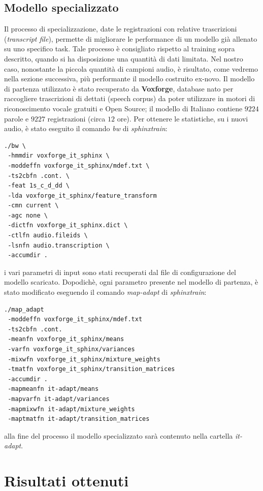 \documentclass[12pt]{article}
\begin{document}
    \subsection{Modello specializzato}
    Il processo di specializzazione, date le registrazioni con relative trascrizioni (\textit{transcript file}), permette di migliorare le performance di un modello già allenato su uno specifico task. Tale processo è consigliato rispetto al training sopra descritto, quando si ha disposizione una quantità di dati limitata. Nel nostro caso, nonostante la piccola quantità di campioni audio, è risultato, come vedremo nella sezione successiva, più performante il modello costruito ex-novo.
    Il modello di partenza utilizzato è stato recuperato da \textbf{Voxforge}, database nato per raccogliere trascrizioni di dettati (speech corpus) da poter utilizzare in motori di riconoscimento vocale gratuiti e Open Source; il modello di Italiano contiene $9224$ parole e $9227$ registrazioni (circa $12$ ore).
    Per ottenere le statistiche, su i nuovi audio, è stato eseguito il comando \textit{bw} di \textit{sphinxtrain}:
    
    \begin{lstlisting}
./bw \
 -hmmdir voxforge_it_sphinx \
 -moddeffn voxforge_it_sphinx/mdef.txt \
 -ts2cbfn .cont. \
 -feat 1s_c_d_dd \
 -lda voxforge_it_sphinx/feature_transform
 -cmn current \
 -agc none \
 -dictfn voxforge_it_sphinx.dict \
 -ctlfn audio.fileids \
 -lsnfn audio.transcription \
 -accumdir .    
    \end{lstlisting} 
    i vari parametri di input sono stati recuperati dal file di configurazione del modello scaricato.
    Dopodichè, ogni parametro presente nel modello di partenza, è stato modificato eseguendo il comando \textit{map-adapt} di \textit{sphinxtrain}:
    \begin{lstlisting}
./map_adapt 
 -moddeffn voxforge_it_sphinx/mdef.txt 
 -ts2cbfn .cont. 
 -meanfn voxforge_it_sphinx/means 
 -varfn voxforge_it_sphinx/variances 
 -mixwfn voxforge_it_sphinx/mixture_weights 
 -tmatfn voxforge_it_sphinx/transition_matrices 
 -accumdir . 
 -mapmeanfn it-adapt/means 
 -mapvarfn it-adapt/variances 
 -mapmixwfn it-adapt/mixture_weights 
 -maptmatfn it-adapt/transition_matrices
    \end{lstlisting}
    
alla fine del processo il modello specializzato sarà contenuto nella cartella \textit{it-adapt}.
\newpage
\section{Risultati ottenuti}
\end{document}
